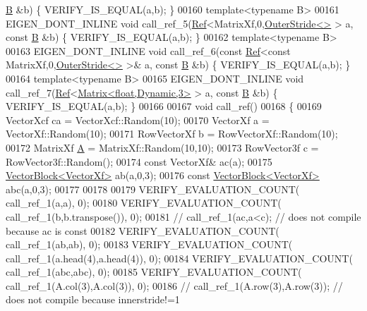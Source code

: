 \begin{DoxyCode}
      \hyperlink{group___core___module_class_eigen_1_1_matrix}{B} &b) \{ VERIFY\_IS\_EQUAL(a,b); \}
00160 \textcolor{keyword}{template}<\textcolor{keyword}{typename} B>
00161 EIGEN\_DONT\_INLINE \textcolor{keywordtype}{void} call\_ref\_5(\hyperlink{group___core___module_class_eigen_1_1_ref}{Ref}<MatrixXf,0,\hyperlink{class_eigen_1_1_outer_stride}{OuterStride<>} > a, \textcolor{keyword}{const} 
      \hyperlink{group___core___module_class_eigen_1_1_matrix}{B} &b) \{ VERIFY\_IS\_EQUAL(a,b); \}
00162 \textcolor{keyword}{template}<\textcolor{keyword}{typename} B>
00163 EIGEN\_DONT\_INLINE \textcolor{keywordtype}{void} call\_ref\_6(\textcolor{keyword}{const} \hyperlink{group___core___module_class_eigen_1_1_ref}{Ref}<\textcolor{keyword}{const} MatrixXf,0,\hyperlink{class_eigen_1_1_outer_stride}{OuterStride<>} >& a, \textcolor{keyword}{const} 
      \hyperlink{group___core___module_class_eigen_1_1_matrix}{B} &b) \{ VERIFY\_IS\_EQUAL(a,b); \}
00164 \textcolor{keyword}{template}<\textcolor{keyword}{typename} B>
00165 EIGEN\_DONT\_INLINE \textcolor{keywordtype}{void} call\_ref\_7(\hyperlink{group___core___module_class_eigen_1_1_ref}{Ref}<\hyperlink{group___core___module_class_eigen_1_1_matrix}{Matrix<float,Dynamic,3>} > a, \textcolor{keyword}{const} 
      \hyperlink{group___core___module_class_eigen_1_1_matrix}{B} &b) \{ VERIFY\_IS\_EQUAL(a,b); \}
00166 
00167 \textcolor{keywordtype}{void} call\_ref()
00168 \{
00169   VectorXcf ca  = VectorXcf::Random(10);
00170   VectorXf a    = VectorXf::Random(10);
00171   RowVectorXf b = RowVectorXf::Random(10);
00172   MatrixXf \hyperlink{group___core___module_class_eigen_1_1_matrix}{A}    = MatrixXf::Random(10,10);
00173   RowVector3f c = RowVector3f::Random();
00174   \textcolor{keyword}{const} VectorXf& ac(a);
00175   \hyperlink{group___core___module_class_eigen_1_1_vector_block}{VectorBlock<VectorXf>} ab(a,0,3);
00176   \textcolor{keyword}{const} \hyperlink{group___core___module_class_eigen_1_1_vector_block}{VectorBlock<VectorXf>} abc(a,0,3);
00177   
00178 
00179   VERIFY\_EVALUATION\_COUNT( call\_ref\_1(a,a), 0);
00180   VERIFY\_EVALUATION\_COUNT( call\_ref\_1(b,b.transpose()), 0);
00181 \textcolor{comment}{//   call\_ref\_1(ac,a<c);           // does not compile because ac is const}
00182   VERIFY\_EVALUATION\_COUNT( call\_ref\_1(ab,ab), 0);
00183   VERIFY\_EVALUATION\_COUNT( call\_ref\_1(a.head(4),a.head(4)), 0);
00184   VERIFY\_EVALUATION\_COUNT( call\_ref\_1(abc,abc), 0);
00185   VERIFY\_EVALUATION\_COUNT( call\_ref\_1(A.col(3),A.col(3)), 0);
00186 \textcolor{comment}{//   call\_ref\_1(A.row(3),A.row(3));    // does not compile because innerstride!=1}

\end{DoxyCode}
